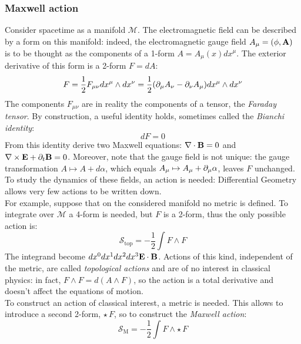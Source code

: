\subsubsection{Maxwell action}

Consider spacetime as a manifold $ \mathcal{M} $. The electromagnetic field can be described by a form on this manifold: indeed, the electromagnetic gauge field $ A_\mu = (\phi,\mathbf{A}) $ is to be thought as the components of a 1-form $ A = A_\mu(x) dx^\mu $. The exterior derivative of this form is a 2-form $ F = dA $:
\begin{equation*}
  F = \frac{1}{2} F_{\mu \nu} dx^\mu \wedge dx^\nu = \frac{1}{2} (\partial_\mu A_\nu - \partial_\nu A_\mu) dx^\mu \wedge dx^\nu
\end{equation*}
The components $ F_{\mu \nu} $ are in reality the components of a tensor, the \textit{Faraday tensor}. By construction, a useful identity holds, sometimes called the \textit{Bianchi identity}:
\begin{equation}
  dF = 0
  \label{eq:3.42}
\end{equation}
From this identity derive two Maxwell equations: $ \nabla\cdot\mathbf{B} = 0 $ and $ \nabla\times\mathbf{E} + \partial_t \mathbf{B} = 0 $. Moreover, note that the gauge field is not unique: the gauge transformation $ A \mapsto A + d\alpha $, which equals $ A_\mu \mapsto A_\mu + \partial_\mu \alpha $, leaves $ F $ unchanged.\\
To study the dynamics of these fields, an action is needed: Differential Geometry allows very few actions to be written down.\\
For example, suppose that on the considered manifold no metric is defined. To integrate over $ \mathcal{M} $ a 4-form is needed, but $ F $ is a 2-form, thus the only possible action is:
\begin{equation}
  \mathcal{S}_{\text{top}} = - \frac{1}{2} \int F \wedge F
  \label{eq:3.43}
\end{equation}
The integrand become $ dx^0 dx^1 dx^2 dx^3 \mathbf{E}\cdot\mathbf{B} $. Actions of this kind, independent of the metric, are called \textit{topological actions} and are of no interest in classical physics: in fact, $ F \wedge F = d (A \wedge F) $, so the action is a total derivative and doesn't affect the equations of motion.\\
To construct an action of classical interest, a metric is needed. This allows to introduce a second 2-form, $ \star\, F $, so to construct the \textit{Maxwell action}:
\begin{equation}
  \mathcal{S}_{\text{M}} = - \frac{1}{2} \int F \wedge \star\, F
  \label{eq:3.44}
\end{equation}
